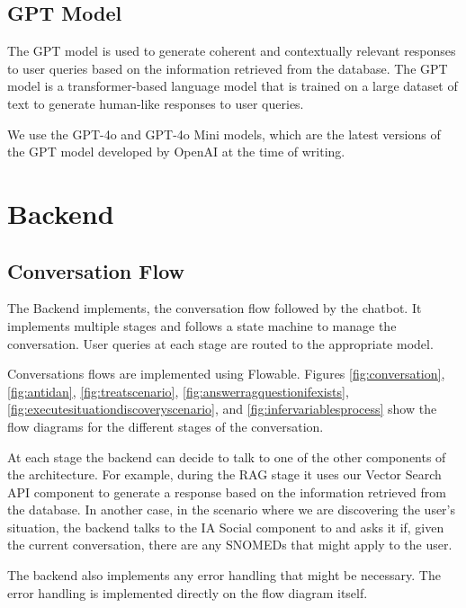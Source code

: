 \documentclass[a4paper,12pt,twoside]{ThesisStyle}
\begin{document}
\subsection{GPT Model}
\label{subsec:gpt_model}

The GPT model is used to generate coherent and contextually relevant responses to user queries based on the information retrieved from the database. The GPT model is a transformer-based \cite{Vaswani2023AttentionNeed} language model that is trained on a large dataset of text to generate human-like responses to user queries.

We use the GPT-4o and GPT-4o Mini models, which are the latest versions of the GPT model developed by OpenAI at the time of writing.

\section{Backend}
\label{sec:backend}

\subsection{Conversation Flow}
\label{subsec:conversation_flow}

The Backend implements, the conversation flow followed by the chatbot. It implements multiple stages and follows a state machine to manage the conversation. User queries at each stage are routed to the appropriate model.

Conversations flows are implemented using Flowable. Figures \ref{fig:conversation}, \ref{fig:antidan}, \ref{fig:treatscenario}, \ref{fig:answerragquestionifexists}, \ref{fig:executesituationdiscoveryscenario}, and \ref{fig:infervariablesprocess} show the flow diagrams for the different stages of the conversation.

At each stage the backend can decide to talk to one of the other components of the architecture. For example, during the RAG stage it uses our Vector Search API component to generate a response based on the information retrieved from the database. In another case, in the scenario where we are discovering the user's situation, the backend talks to the IA Social component to and asks it if, given the current conversation, there are any SNOMEDs that might apply to the user.

The backend also implements any error handling that might be necessary. The error handling is implemented directly on the flow diagram itself.
\end{document}
